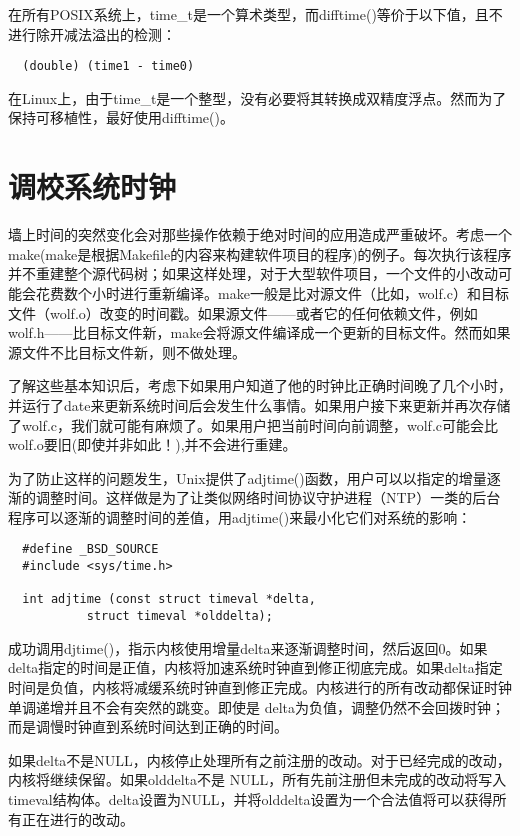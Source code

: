 在所有POSIX系统上，time\_t是一个算术类型，而difftime()等价于以下值，且不进行除开减法溢出的检测：

\begin{lstlisting}
  (double) (time1 - time0)
\end{lstlisting}

在Linux上，由于time\_t是一个整型，没有必要将其转换成双精度浮点。然而为了保持可移植性，最好使用difftime()。 

\section{调校系统时钟}

墙上时间的突然变化会对那些操作依赖于绝对时间的应用造成严重破坏。考虑一个make(make是根据Makefile的内容来构建软件项目的程序)的例子。每次执行该程序并不重建整个源代码树；如果这样处理，对于大型软件项目，一个文件的小改动可能会花费数个小时进行重新编译。make一般是比对源文件（比如，wolf.c）和目标文件（wolf.o）改变的时间戳。如果源文件——或者它的任何依赖文件，例如wolf.h——比目标文件新，make会将源文件编译成一个更新的目标文件。然而如果源文件不比目标文件新，则不做处理。

了解这些基本知识后，考虑下如果用户知道了他的时钟比正确时间晚了几个小时，并运行了date来更新系统时间后会发生什么事情。如果用户接下来更新并再次存储了wolf.c，我们就可能有麻烦了。如果用户把当前时间向前调整，wolf.c可能会比wolf.o要旧(即使并非如此！),并不会进行重建。

为了防止这样的问题发生，Unix提供了adjtime()函数，用户可以以指定的增量逐渐的调整时间。这样做是为了让类似网络时间协议守护进程（NTP）一类的后台程序可以逐渐的调整时间的差值，用adjtime()来最小化它们对系统的影响： 

\begin{lstlisting}
  #define _BSD_SOURCE
  #include <sys/time.h>

  int adjtime (const struct timeval *delta,
	       struct timeval *olddelta);
\end{lstlisting}

成功调用djtime()，指示内核使用增量delta来逐渐调整时间，然后返回0。如果delta指定的时间是正值，内核将加速系统时钟直到修正彻底完成。如果delta指定时间是负值，内核将减缓系统时钟直到修正完成。内核进行的所有改动都保证时钟单调递增并且不会有突然的跳变。即使是 delta为负值，调整仍然不会回拨时钟；而是调慢时钟直到系统时间达到正确的时间。

如果delta不是NULL，内核停止处理所有之前注册的改动。对于已经完成的改动，内核将继续保留。如果olddelta不是 NULL，所有先前注册但未完成的改动将写入timeval结构体。delta设置为NULL，并将olddelta设置为一个合法值将可以获得所有正在进行的改动。

